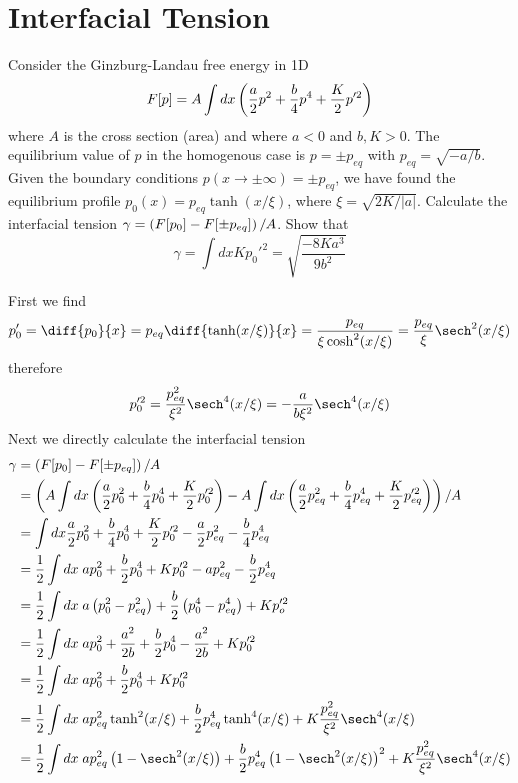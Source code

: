 \clearpage
\section{Interfacial Tension}
\begin{colbox}
	Consider the Ginzburg-Landau free energy in 1D
	\begin{equation}
		F[p] = A\int dx \left(\frac{a}{2}p^2+\frac{b}{4}p^4+\frac{K}{2}p'^2\right)
	\end{equation}
	where $A$ is the cross section (area) and where $a<0$ and $b,K>0$. The equilibrium value of $p$ in the homogenous case is $p=\pm p_{eq}$ with $p_{eq}=\sqrt{-a/b}$. Given the boundary conditions $p(x\rightarrow\pm\infty)=\pm p_{eq}$, we have found the equilibrium profile $p_0(x) = p_{eq}\tanh(x/\xi)$, where $\xi = \sqrt{2K/\lvert a \rvert}$. Calculate the interfacial tension $\gamma = \left(F[p_0]-F[\pm p_{eq}]\right)/A$. Show that
	\begin{equation}
		\gamma = \int dx Kp_0'^2 = \sqrt{\frac{-8Ka^3}{9b^2}}
	\end{equation}
\end{colbox}
First we find
\begin{align}
	p_0'=\diff{p_0}{x}=p_{eq}\diff{\tanh(x/\xi)}{x}=\frac{p_{eq}}{\xi\cosh^2(x/\xi)}=\frac{p_{eq}}{\xi}\sech^2(x/\xi)
\end{align}
therefore
\begin{equation}
	p_0'^2 = \frac{p_{eq}^2}{\xi^2}\sech^4(x/\xi) = -\frac{a}{b\xi^2}\sech^4(x/\xi)
\end{equation}
Next we directly calculate the interfacial tension
\begin{align}
	\gamma &= \ins{F[p_0]-F[\pm p_{eq}]}/A\\
	&= \ins{A\int dx \ins{\frac{a}{2}p_0^2+\frac{b}{4}p_0^4+\frac{K}{2}p_0'^2} - A\int dx \ins{\frac{a}{2}p_{eq}^2+\frac{b}{4}p_{eq}^4+\frac{K}{2}p_{eq}'^2}}/A\\
	&= \int dx\frac{a}{2}p_0^2+\frac{b}{4}p_0^4+\frac{K}{2}p_0'^2-\frac{a}{2}p_{eq}^2-\frac{b}{4}p_{eq}^4\\
	&= \frac{1}{2}\int dx\; ap_0^2+\frac{b}{2}p_0^4+Kp_0'^2-ap_{eq}^2-\frac{b}{2}p_{eq}^4\\
	&= \frac{1}{2}\int dx \; a\ins{p_0^2-p_{eq}^2}+\frac{b}{2}\ins{p_0^4-p_{eq}^4}+Kp_o'^2\\
	&= \frac{1}{2}\int dx \; ap_0^2+\frac{a^2}{2b}+\frac{b}{2}p_0^4-\frac{a^2}{2b}+Kp_0'^2\\
	&= \frac{1}{2}\int dx \; ap_0^2+\frac{b}{2}p_0^4+Kp_0'^2\\
	&= \frac{1}{2}\int dx \; ap_{eq}^2\tanh^2(x/\xi)+\frac{b}{2}p_{eq}^4\tanh^4(x/\xi)+K\frac{p_{eq}^2}{\xi^2}\sech^4(x/\xi)\\
	&= \frac{1}{2}\int dx \; ap_{eq}^2\ins{1-\sech^2(x/\xi)}+\frac{b}{2}p_{eq}^4\ins{1-\sech^2(x/\xi)}^2+K\frac{p_{eq}^2}{\xi^2}\sech^4(x/\xi)
\end{align}
